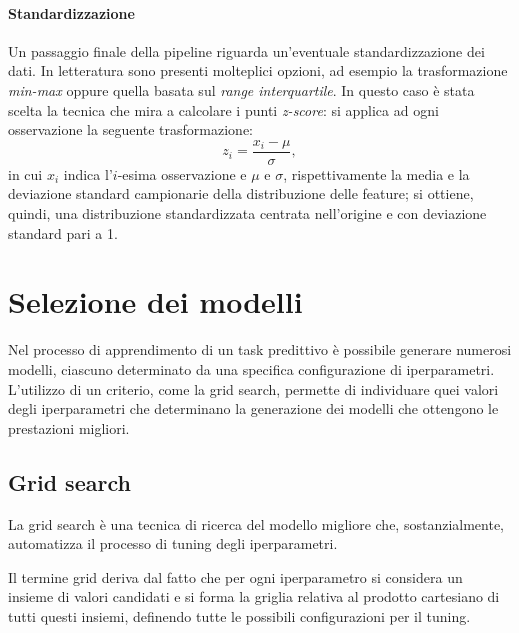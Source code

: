 \documentclass[12pt]{report}
\theoremstyle{definition}
\begin{document}
\paragraph{Standardizzazione}\label{standardization}
Un passaggio finale della pipeline riguarda un'eventuale standardizzazione dei dati. In letteratura sono presenti molteplici opzioni, ad esempio la trasformazione \textit{min-max} oppure quella basata sul \textit{range interquartile}. In questo caso è stata scelta la tecnica che mira a calcolare i punti \textit{z-score}: si applica ad ogni osservazione la seguente trasformazione:
\begin{equation}
    z_i = \frac{x_i - \mu}{\sigma},
\end{equation}
in cui $x_i$ indica l'$i$-esima osservazione e $\mu$ e $\sigma$, rispettivamente la media e la deviazione standard campionarie della distribuzione delle feature; si ottiene, quindi, una distribuzione standardizzata centrata nell'origine e con deviazione standard pari a 1.

\section{Selezione dei modelli}\label{modelselection}
Nel processo di apprendimento di un task predittivo è possibile generare numerosi modelli, ciascuno determinato da una specifica configurazione di iperparametri. L'utilizzo di un criterio, come la grid search, permette di individuare quei valori degli iperparametri che determinano la generazione dei modelli che ottengono le prestazioni migliori.

\subsection{Grid search}\label{gs}
La grid search è una tecnica di ricerca del modello migliore che, sostanzialmente, automatizza il processo di tuning degli iperparametri.

Il termine grid deriva dal fatto che per ogni iperparametro si considera un insieme di valori candidati e si forma la griglia relativa al prodotto cartesiano di tutti questi insiemi, definendo tutte le possibili configurazioni per il tuning.
\end{document}
